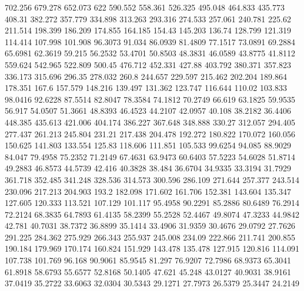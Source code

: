 702.256      679.278      652.073      622      590.552      558.361      526.325      495.048      464.833      435.773      408.31      382.272      357.779      334.898      313.263      293.316      274.533      257.061      240.781      225.62      211.514      198.399      186.209      174.855      164.185      154.43      145.203      136.74      128.799      121.319      114.414      107.998      101.908      96.3073      91.034      86.0939      81.4809      77.1517      73.0891      69.2884      65.6981      62.3619      59.215      56.2532      53.4701      50.8503      48.3831      46.0589      43.8775      41.8112      
559.624      542.965      522.809      500.45      476.712      452.331      427.88      403.792      380.371      357.823      336.173      315.696      296.35      278.032      260.8      244.657      229.597      215.462      202.204      189.864      178.351      167.6      157.579      148.216      139.497      131.362      123.747      116.644      110.02      103.833      98.0416      92.6228      87.5514      82.8047      78.3584      74.1812      70.2749      66.619      63.1825      59.9535      56.917      54.0507      51.3661      48.8393      46.4523      44.2107      42.0957      40.108      38.2182      36.4406      
448.385      435.613      421.006      404.174      386.227      367.648      348.888      330.27      312.057      294.405      277.437      261.213      245.804      231.21      217.438      204.478      192.272      180.822      170.072      160.056      150.625      141.803      133.554      125.83      118.606      111.851      105.533      99.6254      94.085      88.9029      84.047      79.4958      75.2352      71.2149      67.4631      63.9473      60.6403      57.5223      54.6028      51.8714      49.2883      46.8573      44.5739      42.416      40.3828      38.484      36.6704      34.9335      33.3194      31.7929      
361.718      352.485      341.248      328.536      314.573      300.596      286.109      271.644      257.377      243.514      230.096      217.213      204.903      193.2      182.098      171.602      161.706      152.381      143.604      135.347      127.605      120.333      113.521      107.129      101.117      95.4958      90.2291      85.2886      80.6489      76.2914      72.2124      68.3835      64.7893      61.4135      58.2399      55.2528      52.4467      49.8074      47.3233      44.9842      42.781      40.7031      38.7372      36.8899      35.1414      33.4906      31.9359      30.4676      29.0792      27.7626      
291.225      284.362      275.929      266.343      255.937      245.008      234.09      222.866      211.741      200.855      190.184      179.969      170.174      160.824      151.929      143.478      135.478      127.915      120.816      114.091      107.738      101.769      96.168      90.9061      85.9545      81.297      76.9207      72.7986      68.9373      65.3041      61.8918      58.6793      55.6577      52.8168      50.1405      47.621      45.248      43.0127      40.9031      38.9161      37.0419      35.2722      33.6063      32.0304      30.5343      29.1271      27.7973      26.5379      25.3447      24.2149      
